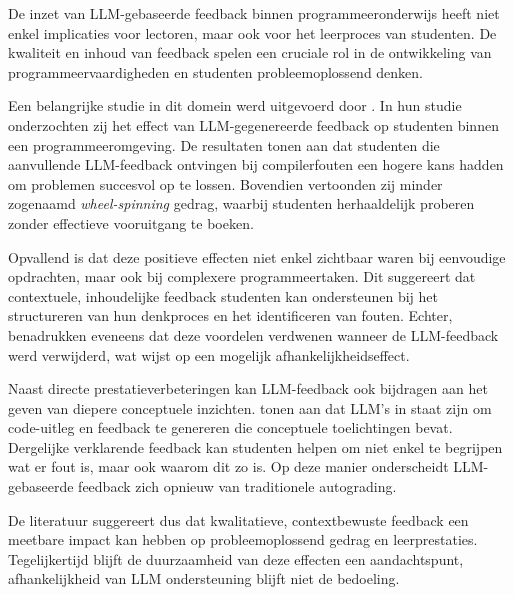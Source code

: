 De inzet van LLM-gebaseerde feedback binnen programmeeronderwijs heeft niet enkel implicaties voor lectoren, maar ook voor het leerproces van studenten. De kwaliteit en inhoud van feedback spelen een cruciale rol in de ontwikkeling van programmeervaardigheden en studenten probleemoplossend denken.

\vspace{1em}

Een belangrijke studie in dit domein werd uitgevoerd door \textcite{Zhou2025}. In hun studie onderzochten zij het effect van LLM-gegenereerde feedback op studenten binnen een programmeeromgeving. De resultaten tonen aan dat studenten die aanvullende LLM-feedback ontvingen bij compilerfouten een hogere kans hadden om problemen succesvol op te lossen. Bovendien vertoonden zij minder zogenaamd \textit{wheel-spinning} gedrag, waarbij studenten herhaaldelijk proberen zonder effectieve vooruitgang te boeken.

\vspace{1em}

Opvallend is dat deze positieve effecten niet enkel zichtbaar waren bij eenvoudige opdrachten, maar ook bij complexere programmeertaken. Dit suggereert dat contextuele, inhoudelijke feedback studenten kan ondersteunen bij het structureren van hun denkproces en het identificeren van fouten. Echter, \textcite{Zhou2025} benadrukken eveneens dat deze voordelen verdwenen wanneer de LLM-feedback werd verwijderd, wat wijst op een mogelijk afhankelijkheidseffect.

\vspace{1em}

Naast directe prestatieverbeteringen kan LLM-feedback ook bijdragen aan het geven van diepere conceptuele inzichten. \textcite{Sarsa2022} tonen aan dat LLM’s in staat zijn om code-uitleg en feedback te genereren die conceptuele toelichtingen bevat. Dergelijke verklarende feedback kan studenten helpen om niet enkel te begrijpen wat er fout is, maar ook waarom dit zo is. Op deze manier onderscheidt LLM-gebaseerde feedback zich opnieuw van traditionele autograding.

\vspace{1em}

De literatuur suggereert dus dat kwalitatieve, contextbewuste feedback een meetbare impact kan hebben op probleemoplossend gedrag en leerprestaties. Tegelijkertijd blijft de duurzaamheid van deze effecten een aandachtspunt, afhankelijkheid van LLM ondersteuning blijft niet de bedoeling.

